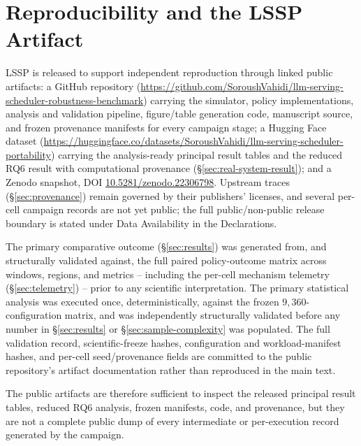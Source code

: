 \section{Reproducibility and the LSSP Artifact}
\label{sec:artifact}

LSSP is released to support independent reproduction through linked
public artifacts: a GitHub repository
(\url{https://github.com/SoroushVahidi/llm-serving-scheduler-robustness-benchmark})
carrying the simulator, policy implementations, analysis and validation
pipeline, figure/table generation code, manuscript source, and frozen
provenance manifests for every campaign stage; a Hugging Face dataset
(\url{https://huggingface.co/datasets/SoroushVahidi/llm-serving-scheduler-portability})
carrying the analysis-ready principal result tables and the reduced RQ6
result with computational provenance (\S\ref{sec:real-system-result}); and a
Zenodo snapshot, DOI
\href{https://doi.org/10.5281/zenodo.22306798}{10.5281/zenodo.22306798}.
Upstream traces (\S\ref{sec:provenance}) remain governed by their
publishers' licenses, and several per-cell campaign records are not yet
public; the full public/non-public release boundary is stated under Data
Availability in the Declarations.

The primary comparative outcome (\S\ref{sec:results}) was generated from,
and structurally validated against, the full paired policy-outcome matrix
across windows, regions, and metrics -- including the per-cell mechanism
telemetry (\S\ref{sec:telemetry}) -- prior to any scientific
interpretation. The primary statistical analysis was executed once,
deterministically, against the frozen $9{,}360$-configuration matrix, and
was independently structurally validated before any number in
\S\ref{sec:results} or \S\ref{sec:sample-complexity} was populated. The
full validation record, scientific-freeze hashes, configuration and
workload-manifest hashes, and per-cell seed/provenance fields are committed
to the public repository's artifact documentation rather than reproduced in
the main text.

The public artifacts are therefore sufficient to inspect the released
principal result tables, reduced RQ6 analysis, frozen manifests, code, and
provenance, but they are not a complete public dump of every intermediate
or per-execution record generated by the campaign.
